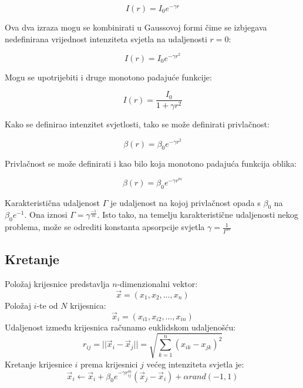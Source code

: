 \begin{equation}
	I(r) = I_0 e^{-\gamma r}
\end{equation}

Ova dva izraza mogu se kombinirati u Gaussovoj formi čime se izbjegava nedefinirana vrijednost intenziteta svjetla na udaljenosti $r = 0$:

\begin{equation}
	I(r) = I_0 e^{-\gamma r^2}
\end{equation}

Mogu se upotrijebiti i druge monotono padajuće funkcije:

\begin{equation}
	I(r) = \frac{I_0}{1 + \gamma r^2}
\end{equation}

Kako se definirao intenzitet svjetlosti, tako se može definirati privlačnost:

\begin{equation}
	\beta(r) = \beta_0 e^{-\gamma r^2}
\end{equation}

Privlačnost se može definirati i kao bilo koja monotono padajuća funkcija oblika:

\begin{equation}
	\beta(r) = \beta_0 e^{-\gamma r^m}
\end{equation}


Karakteristična udaljenost $\Gamma$ je udaljenost na kojoj privlačnost opada s $\beta_0$ na $\beta_0e^{-1}$. Ona iznosi $\Gamma = \gamma^{\frac{-1}{m}}$. Isto tako, na temelju karakteristične udaljenosti nekog problema, može se odrediti konstanta apsorpcije svjetla $\gamma = \frac{1}{\Gamma^m}$

\subsection{Kretanje}
Položaj krijesnice predstavlja $n$-dimenzionalni vektor:
\begin{equation}
	\vec{x} = (x_1, x_2, \dots, x_n)
\end{equation}
Položaj $i$-te od $N$ krijesnica:
\begin{equation}
	\vec{x}_i = (x_{i1}, x_{i2}, \dots, x_{in})
\end{equation}
Udaljenost između krijesnica računamo euklidskom udaljenošću:
\begin{equation}
	r_{ij} = ||\vec{x}_i - \vec{x}_j|| = \sqrt{\sum_{k = 1}^{n}(x_{ik} - x_{jk})^2}
\end{equation} 
Kretanje krijesnice $i$ prema krijesnici $j$ većeg intenziteta svjetla je:
\begin{equation}
	\vec{x}_i \leftarrow \vec{x}_i + \beta_0e^{-\gamma r_{ij}^m}(\vec{x}_j - \vec{x}_i) + \alpha rand(-1, 1)
\end{equation}

